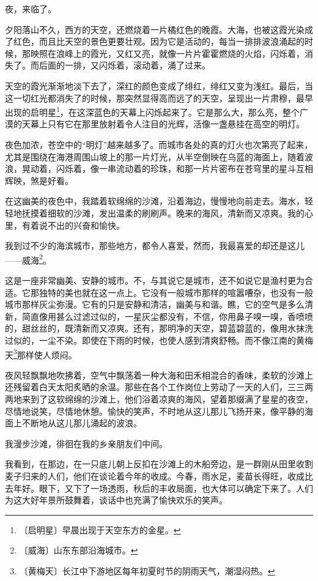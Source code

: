 \documentclass[12pt,UTF-8,openany]{ctexbook}
\begin{document}
\begin{Large}
    
    夜，来临了。
    
    夕阳落山不久，西方的天空，还燃烧着一片橘红色的晚霞。大海，也被这霞光染成了红色，而且比天空的景色更要壮观。因为它是活动的，每当一排排波浪涌起的时候，那映照在浪峰上的霞光，又红又亮，就像一片片霍霍燃烧的火焰，闪烁着，消失了。而后面的一排，又闪烁着，滚动着，涌了过来。
    
    天空的霞光渐渐地淡下去了，深红的颜色变成了绯红，绯红又变为浅红。最后，当这一切红光都消失了的时候，那突然显得高而远了的天空，呈现出一片肃穆，最早出现的启明星\footnote{〔启明星〕早晨出现于天空东方的金星。}，在这深蓝色的天幕上闪烁起来了。它是那么大，那么亮，整个广漠的天幕上只有它在那里放射着令人注目的光辉，活像一盏悬挂在高空的明灯。
    
    夜色加浓，苍空中的“明灯”越来越多了。而城市各处的真的灯火也次第亮了起来，尤其是围绕在海港周围山坡上的那一片灯光，从半空倒映在乌蓝的海面上，随着波浪，晃动着，闪烁着，像一串流动着的珍珠，和那一片片密布在苍穹里的星斗互相辉映，煞是好看。
    
    在这幽美的夜色中，我踏着软绵绵的沙滩，沿着海边，慢慢地向前走去。海水，轻轻地抚摸着细软的沙滩，发出温柔的刷刷声。晚来的海风，清新而又凉爽。我的心里，有着说不出的兴奋和愉快。
    
    我到过不少的海滨城市，那些地方，都令人喜爱，然而，我最喜爱的却还是这儿——威海\footnote{〔威海〕山东东部沿海城市。}。
    
    这是一座非常幽美、安静的城市。不，与其说它是城市，还不如说它是渔村更为合适。它那独特的美也就在这一点上。它没有一般城市那样的喧嚣嘈杂，也没有一般城市那样灰尘弥漫。它有的只是安静和清洁，幽美与和谐。瞧，它的空气是多么清新，简直像用甚么过滤过似的，一星灰尘都没有，不信，你用鼻子嗅一嗅，香喷喷的，甜丝丝的，既清新而又凉爽。还有，那明净的天空，碧蓝碧蓝的，像用水抹洗过似的，一尘不染。即使在下雨的时候，也使人感到清爽舒畅。而不像江南的黄梅天\footnote{〔黄梅天〕长江中下游地区每年初夏时节的阴雨天气，潮湿闷热。}那样使人烦闷。
    
    夜风轻飘飘地吹拂着，空气中飘荡着一种大海和田禾相混合的香味，柔软的沙滩上还残留着白天太阳炙晒的余温。那些在各个工作岗位上劳动了一天的人们，三三两两地来到了这软绵绵的沙滩上，他们浴着凉爽的海风，望着那缀满了星星的夜空，尽情地说笑，尽情地休憩。愉快的笑声，不时地从这儿那儿飞扬开来，像平静的海面上不断地从这儿那儿涌起的波浪。
    
    我漫步沙滩，徘徊在我的乡亲朋友们中间。
    
    我看到，在那边，在一只底儿朝上反扣在沙滩上的木船旁边，是一群刚从田里收割麦子归来的人们，他们在谈论着今年的收成。今春，雨水足，麦苗长得旺，收成比去年好。眼下，又下了一场透雨，秋后的丰收局面，也大体可以确定下来了。人们为这大好年景所鼓舞着，谈话中也充满了愉快欢乐的笑声。
    

\end{Large}
\end{document}
